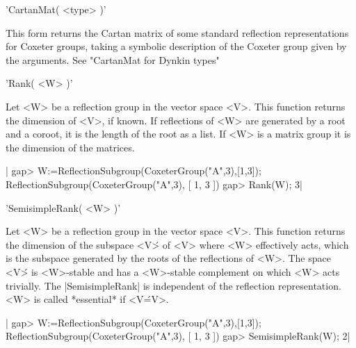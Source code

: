 'CartanMat( <type> )'

This   form  returns  the   Cartan  matrix  of   some  standard  reflection
representations  for Coxeter groups,  taking a symbolic  description of the
Coxeter group given by the arguments. See "CartanMat for Dynkin types"


'Rank( <W> )'

Let  <W>  be  a  reflection  group  in  the vector space <V>. This function
returns the dimension of <V>, if known. If reflections of <W> are generated
by a root and a coroot, it is the length of the root as a list. If <W> is a
matrix group it is the dimension of the matrices.

|    gap> W:=ReflectionSubgroup(CoxeterGroup("A",3),[1,3]);
    ReflectionSubgroup(CoxeterGroup("A",3), [ 1, 3 ])
    gap> Rank(W);
    3|


'SemisimpleRank( <W> )'

Let  <W>  be  a  reflection  group  in  the vector space <V>. This function
returns  the dimension of  the subspace <V\'>  of <V> where <W> effectively
acts,  which is the subspace  generated by the roots  of the reflections of
<W>. The space <V\'> is <W>-stable and has a <W>-stable complement on which
<W>  acts trivially. The |SemisimpleRank|  is independent of the reflection
representation. <W> is called *essential* if <V\'=V>.

|    gap> W:=ReflectionSubgroup(CoxeterGroup("A",3),[1,3]);
    ReflectionSubgroup(CoxeterGroup("A",3), [ 1, 3 ])
    gap> SemisimpleRank(W);
    2|

